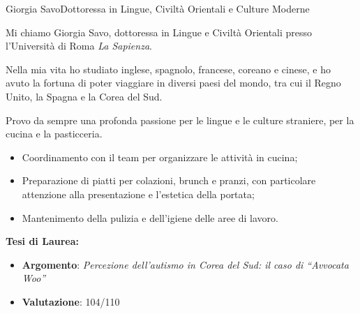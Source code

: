 \documentclass{article}
\begin{document}
\begin{cv}[avatar]{Giorgia Savo}{Dottoressa in Lingue, Civiltà Orientali e Culture Moderne}


\small
Mi chiamo Giorgia Savo, dottoressa in Lingue e Civiltà Orientali presso l'Università di Roma \textit{La Sapienza}.

Nella mia vita ho studiato inglese, spagnolo, francese, coreano e cinese,
e ho avuto la fortuna di poter viaggiare in diversi paesi del mondo, tra cui il Regno Unito, la Spagna e la Corea del Sud.

Provo da sempre una profonda passione per le lingue e le culture straniere, per la cucina e la pasticceria.

\normalsize
{}  %

\begin{cvevent}[Ottobre 2024][Dicembre 2024]
    \begin{itemize}
	\item Coordinamento con il team per organizzare le attività in cucina;  
        \item Preparazione di piatti per colazioni, brunch e pranzi, con particolare attenzione alla presentazione e l'estetica della portata;  
        \item Mantenimento della pulizia e dell'igiene delle aree di lavoro.
    \end{itemize}
\end{cvevent}


\begin{cvevent}[Settembre 2019][Settembre 2023]
    \textbf{Tesi di Laurea:}
    \begin{itemize}
        \item \textbf{Argomento}: \textit{Percezione dell’autismo in Corea del Sud: il caso di “Avvocata Woo”}
        \item \textbf{Valutazione}: 104/110
    \end{itemize}
\end{cvevent}


\end{cv}
\end{document}
